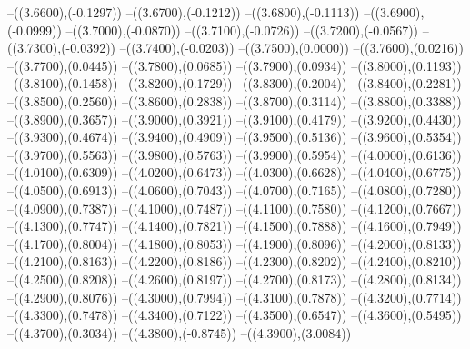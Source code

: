{	--({\sx*(3.6600)},{\sy*(-0.1297)})
	--({\sx*(3.6700)},{\sy*(-0.1212)})
	--({\sx*(3.6800)},{\sy*(-0.1113)})
	--({\sx*(3.6900)},{\sy*(-0.0999)})
	--({\sx*(3.7000)},{\sy*(-0.0870)})
	--({\sx*(3.7100)},{\sy*(-0.0726)})
	--({\sx*(3.7200)},{\sy*(-0.0567)})
	--({\sx*(3.7300)},{\sy*(-0.0392)})
	--({\sx*(3.7400)},{\sy*(-0.0203)})
	--({\sx*(3.7500)},{\sy*(0.0000)})
	--({\sx*(3.7600)},{\sy*(0.0216)})
	--({\sx*(3.7700)},{\sy*(0.0445)})
	--({\sx*(3.7800)},{\sy*(0.0685)})
	--({\sx*(3.7900)},{\sy*(0.0934)})
	--({\sx*(3.8000)},{\sy*(0.1193)})
	--({\sx*(3.8100)},{\sy*(0.1458)})
	--({\sx*(3.8200)},{\sy*(0.1729)})
	--({\sx*(3.8300)},{\sy*(0.2004)})
	--({\sx*(3.8400)},{\sy*(0.2281)})
	--({\sx*(3.8500)},{\sy*(0.2560)})
	--({\sx*(3.8600)},{\sy*(0.2838)})
	--({\sx*(3.8700)},{\sy*(0.3114)})
	--({\sx*(3.8800)},{\sy*(0.3388)})
	--({\sx*(3.8900)},{\sy*(0.3657)})
	--({\sx*(3.9000)},{\sy*(0.3921)})
	--({\sx*(3.9100)},{\sy*(0.4179)})
	--({\sx*(3.9200)},{\sy*(0.4430)})
	--({\sx*(3.9300)},{\sy*(0.4674)})
	--({\sx*(3.9400)},{\sy*(0.4909)})
	--({\sx*(3.9500)},{\sy*(0.5136)})
	--({\sx*(3.9600)},{\sy*(0.5354)})
	--({\sx*(3.9700)},{\sy*(0.5563)})
	--({\sx*(3.9800)},{\sy*(0.5763)})
	--({\sx*(3.9900)},{\sy*(0.5954)})
	--({\sx*(4.0000)},{\sy*(0.6136)})
	--({\sx*(4.0100)},{\sy*(0.6309)})
	--({\sx*(4.0200)},{\sy*(0.6473)})
	--({\sx*(4.0300)},{\sy*(0.6628)})
	--({\sx*(4.0400)},{\sy*(0.6775)})
	--({\sx*(4.0500)},{\sy*(0.6913)})
	--({\sx*(4.0600)},{\sy*(0.7043)})
	--({\sx*(4.0700)},{\sy*(0.7165)})
	--({\sx*(4.0800)},{\sy*(0.7280)})
	--({\sx*(4.0900)},{\sy*(0.7387)})
	--({\sx*(4.1000)},{\sy*(0.7487)})
	--({\sx*(4.1100)},{\sy*(0.7580)})
	--({\sx*(4.1200)},{\sy*(0.7667)})
	--({\sx*(4.1300)},{\sy*(0.7747)})
	--({\sx*(4.1400)},{\sy*(0.7821)})
	--({\sx*(4.1500)},{\sy*(0.7888)})
	--({\sx*(4.1600)},{\sy*(0.7949)})
	--({\sx*(4.1700)},{\sy*(0.8004)})
	--({\sx*(4.1800)},{\sy*(0.8053)})
	--({\sx*(4.1900)},{\sy*(0.8096)})
	--({\sx*(4.2000)},{\sy*(0.8133)})
	--({\sx*(4.2100)},{\sy*(0.8163)})
	--({\sx*(4.2200)},{\sy*(0.8186)})
	--({\sx*(4.2300)},{\sy*(0.8202)})
	--({\sx*(4.2400)},{\sy*(0.8210)})
	--({\sx*(4.2500)},{\sy*(0.8208)})
	--({\sx*(4.2600)},{\sy*(0.8197)})
	--({\sx*(4.2700)},{\sy*(0.8173)})
	--({\sx*(4.2800)},{\sy*(0.8134)})
	--({\sx*(4.2900)},{\sy*(0.8076)})
	--({\sx*(4.3000)},{\sy*(0.7994)})
	--({\sx*(4.3100)},{\sy*(0.7878)})
	--({\sx*(4.3200)},{\sy*(0.7714)})
	--({\sx*(4.3300)},{\sy*(0.7478)})
	--({\sx*(4.3400)},{\sy*(0.7122)})
	--({\sx*(4.3500)},{\sy*(0.6547)})
	--({\sx*(4.3600)},{\sy*(0.5495)})
	--({\sx*(4.3700)},{\sy*(0.3034)})
	--({\sx*(4.3800)},{\sy*(-0.8745)})
	--({\sx*(4.3900)},{\sy*(3.0084)})
}
